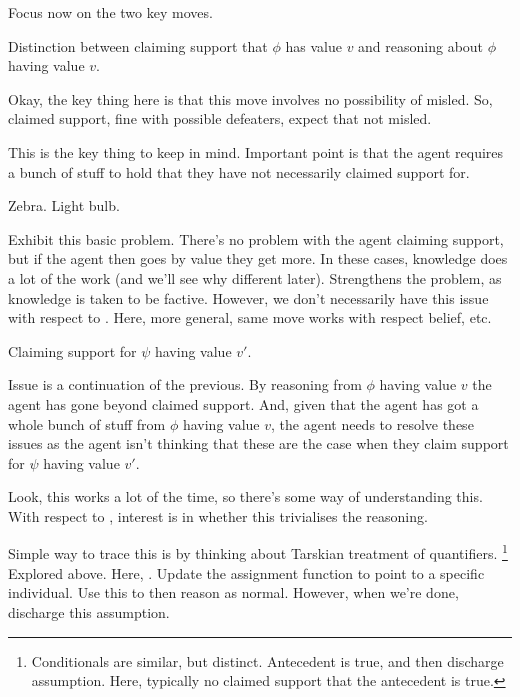 \begin{note}
  Focus now on the two key moves.
\end{note}

\begin{note}
  Distinction between claiming support that \(\phi\) has value \(v\) and reasoning about \(\phi\) having value \(v\).

  Okay, the key thing here is that this move involves no possibility of misled.
  So, claimed support, fine with possible defeaters, expect that not misled.

  This is the key thing to keep in mind.
  Important point is that the agent requires a bunch of stuff to hold that they have not necessarily claimed support for.
\end{note}

\begin{note}
  Zebra.
  Light bulb.

  Exhibit this basic problem.
  There's no problem with the agent claiming support, but if the agent then goes by value they get more.
  In these cases, knowledge does a lot of the work (and we'll see why different later).
  Strengthens the problem, as knowledge is taken to be factive.
  However, we don't necessarily have this issue with respect to \nI{}.
  Here, more general, same move works with respect belief, etc.
\end{note}

\begin{note}
  Claiming support for \(\psi\) having value \(v'\).

  Issue is a continuation of the previous.
  By reasoning from \(\phi\) having value \(v\) the agent has gone beyond claimed support.
  And, given that the agent has got a whole bunch of stuff from \(\phi\) having value \(v\), the agent needs to resolve these issues as the agent isn't thinking that these are the case when they claim support for \(\psi\) having value \(v'\).

  Look, this works a lot of the time, so there's some way of understanding this.
  With respect to \nI{}, interest is in whether this trivialises the reasoning.
\end{note}

\begin{note}[Example]
  Simple way to trace this is by thinking about Tarskian treatment of quantifiers.\nolinebreak
  \footnote{
    Conditionals are similar, but distinct.
    Antecedent is true, and then discharge assumption.
    Here, typically no claimed support that the antecedent is true.
  }
  Explored above.
  Here, \ur{}.
  Update the assignment function to point to a specific individual.
  Use this to then reason as normal.
  However, when we're done, discharge this assumption.
\end{note}

